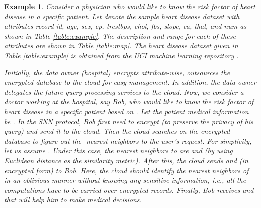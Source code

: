 \documentclass{article}
\newtheorem{example}{Example}
\begin{document}
\begin{example}\label{sec:example}
Consider a physician who would like to know the risk factor of heart disease in a specific patient.
Let  denote the sample heart disease dataset with attributes \textit{record-id}, \textit{age}, \textit{sex}, \textit{cp}, 
\textit{trestbps}, \textit{chol}, \textit{fbs}, \textit{slope}, \textit{ca}, \textit{thal}, and \textit{num} 
as shown in Table \ref{table:example}. The description and range for each of these attributes 
are shown in Table \ref{table:map}. The heart disease dataset 
given in Table  \ref{table:example} is obtained from the UCI machine learning repository \cite{uci-dataset-heart}.

Initially, the data owner (hospital) encrypts  attribute-wise, outsources the encrypted database  
to the cloud for easy management. In addition, the data owner delegates the future query processing 
services to the cloud. Now, we consider a doctor working at the hospital, say Bob, who would 
like to know the risk factor of heart disease in a specific 
patient based on . Let the patient medical information 
be  . In the SNN protocol, Bob first need to encrypt 
 (to preserve the privacy of his query) and send it to the cloud. Then the cloud searches on the encrypted database 
 to figure out the -nearest neighbors to the user's request. For simplicity, 
let us assume . Under this case, the  nearest neighbors to  are  and 
 (by using Euclidean distance as the similarity metric). After this, the cloud 
sends  and  (in encrypted form) to Bob. Here, the cloud should identify the 
nearest neighbors of  in an oblivious manner without knowing any sensitive information, i.e., all 
the computations have to be carried over encrypted records. Finally, Bob receives  
 and  that will help him to make medical decisions. 
\hfill 
\end{example}
\end{document}
